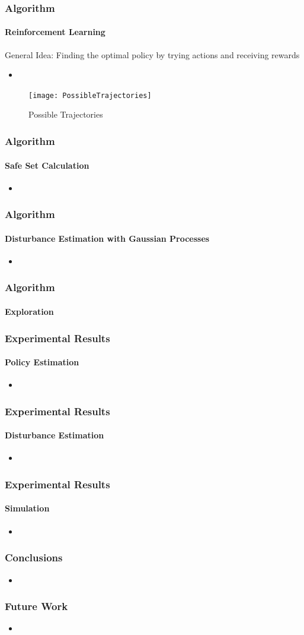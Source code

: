 \documentclass[t]{beamer}
\begin{document}
\begin{frame}
\frametitle{Algorithm}
\framesubtitle{Reinforcement Learning}
General Idea: Finding the optimal policy by trying actions and receiving rewards
\begin{itemize}
\item 
\end{itemize}

\begin{figure}[h!]
\texttt{[image: PossibleTrajectories]}
\caption{Possible Trajectories}
\end{figure}


\end{frame}


\begin{frame}
\frametitle{Algorithm}
\framesubtitle{Safe Set Calculation}
\begin{itemize}
\item 
\end{itemize}
\end{frame}


\begin{frame}
\frametitle{Algorithm}
\framesubtitle{Disturbance Estimation with Gaussian Processes}
\begin{itemize}
\item 
\end{itemize}
\end{frame}

\begin{frame}
\frametitle{Algorithm}
\framesubtitle{Exploration}
\end{frame}

\begin{frame}
\frametitle{Experimental Results}
\framesubtitle{Policy Estimation}
\begin{itemize}
\item 
\end{itemize}
\end{frame}

\begin{frame}
\frametitle{Experimental Results}
\framesubtitle{Disturbance Estimation}
\begin{itemize}
\item 
\end{itemize}
\end{frame}

\begin{frame}
\frametitle{Experimental Results}
\framesubtitle{Simulation}
\begin{itemize}
\item 
\end{itemize}
\end{frame}


\begin{frame}
\frametitle{Conclusions}
\begin{itemize}
\item 
\end{itemize}
\end{frame}

\begin{frame}
\frametitle{Future Work}
\begin{itemize}
\item 
\end{itemize}
\end{frame}
\end{document}
